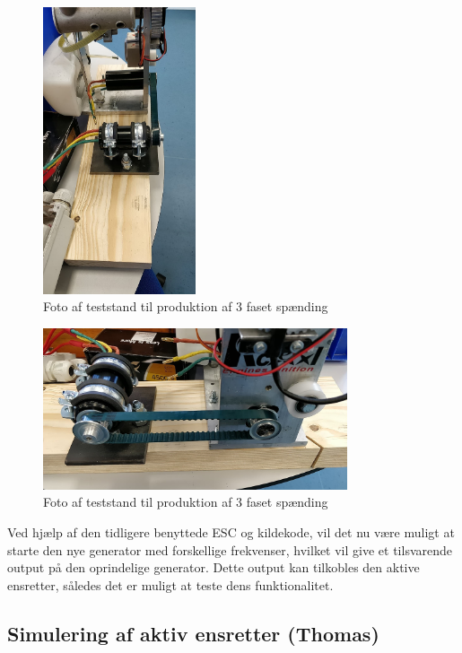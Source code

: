 \begin{figure}[h]
  \centering
  \includegraphics[width=0.4\textwidth]{teststand1.jpg}
  \caption{Foto af teststand til produktion af 3 faset spænding}
  \label{fig:test1}
\end{figure}
\clearpage
\begin{figure}[h]
  \centering
  \includegraphics[width=0.8\textwidth]{teststand2.jpg}
  \caption{Foto af teststand til produktion af 3 faset spænding}
  \label{fig:test2}
\end{figure}

Ved hjælp af den tidligere benyttede ESC og kildekode, vil det nu være muligt at starte den nye generator med forskellige frekvenser, hvilket vil give et tilsvarende output på den oprindelige generator. Dette output kan tilkobles den aktive ensretter, således det er muligt at teste dens funktionalitet.
\clearpage
\subsection{Simulering af aktiv ensretter (Thomas)}
\label{sec:simulering-af-aktiv}

